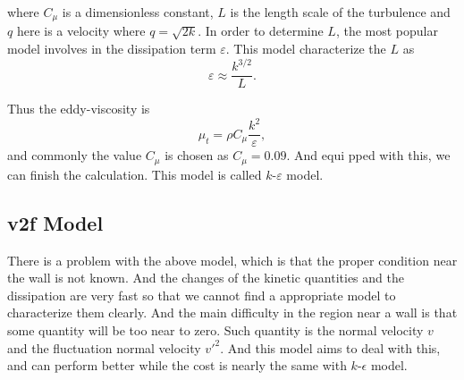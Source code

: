 \documentclass[english, nochinese]{pkupaper}
\begin{document}
where $C_{\mu}$ is a dimensionless constant, $L$ is the length scale of the turbulence and $q$ here is a velocity where $q = \sqrt{2k}$. In order to determine $L$, the most popular model involves in the dissipation term $\varepsilon$. This model characterize the $L$ as 
\begin{equation}
	\varepsilon\approx\frac{k^{3/2}}{L}.
\end{equation}
\par Thus the eddy-viscosity is 
\begin{equation}
	\mu_t = \rho C_\mu\frac{k^2}{\varepsilon},
\end{equation}  
and commonly the value $C_\mu$ is chosen as $C_\mu = 0.09$. And equi pped with this, we can finish the calculation. This model is called $k$-$\varepsilon$ model.

\subsection{v2f Model}
\par There is a problem with the above model, which is that the proper condition near the wall is not known. And the changes of the kinetic quantities and the dissipation are very fast so that we cannot find a appropriate model to characterize them clearly. And the main difficulty in the region near a wall is that some quantity will be too near to zero. Such quantity is the normal velocity $v$ and the fluctuation normal velocity $v'^2$. And this model aims to deal with this, and can perform better while the cost is nearly the same with $k$-$\epsilon$ model.
\end{document}
